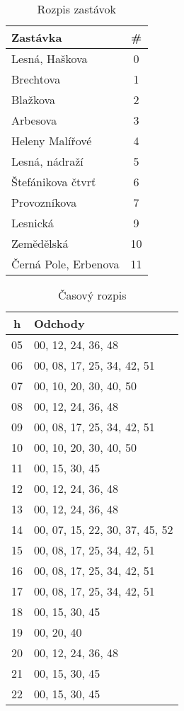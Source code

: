 \begin{table}[h]
  \centering
  \begin{tabular}{|l|c|}
    \hline
    \textbf{Zastávka} & \# \\ \hline
    Lesná, Haškova & 0 \\ \hline
    Brechtova & 1 \\ \hline
    Blažkova & 2 \\ \hline
    Arbesova & 3 \\ \hline
    Heleny Malířové & 4 \\ \hline
    Lesná, nádraží & 5 \\ \hline
    Štefánikova čtvrť & 6 \\ \hline
    Provozníkova & 7 \\ \hline
    Lesnická & 9 \\ \hline
    Zemědělská & 10 \\ \hline
    Černá Pole, Erbenova & 11 \\ \hline
  \end{tabular}
  \caption{Rozpis zastávok}
\end{table}

\begin{table}[h]
  \centering
  \begin{tabular}{|c|l|}
    \hline
    \textbf{h} & \textbf{Odchody} \\ \hline
    05 & 00, 12, 24, 36, 48 \\ \hline
    06 & 00, 08, 17, 25, 34, 42, 51 \\ \hline
    07 & 00, 10, 20, 30, 40, 50 \\ \hline
    08 & 00, 12, 24, 36, 48 \\ \hline
    09 & 00, 08, 17, 25, 34, 42, 51 \\ \hline
    10 & 00, 10, 20, 30, 40, 50 \\ \hline
    11 & 00, 15, 30, 45 \\ \hline
    12 & 00, 12, 24, 36, 48 \\ \hline
    13 & 00, 12, 24, 36, 48 \\ \hline
    14 & 00, 07, 15, 22, 30, 37, 45, 52 \\ \hline
    15 & 00, 08, 17, 25, 34, 42, 51 \\ \hline
    16 & 00, 08, 17, 25, 34, 42, 51 \\ \hline
    17 & 00, 08, 17, 25, 34, 42, 51 \\ \hline
    18 & 00, 15, 30, 45 \\ \hline
    19 & 00, 20, 40 \\ \hline
    20 & 00, 12, 24, 36, 48 \\ \hline
    21 & 00, 15, 30, 45 \\ \hline
    22 & 00, 15, 30, 45 \\ \hline
  \end{tabular}
  \caption{Časový rozpis}
\end{table}
